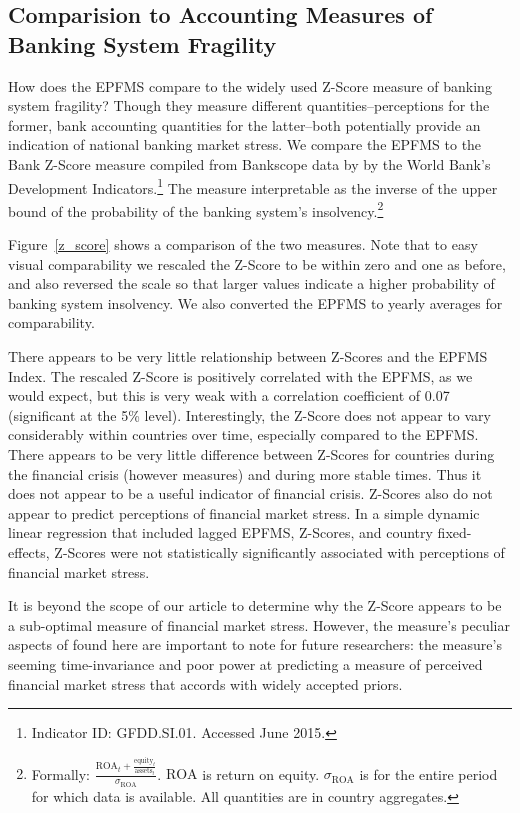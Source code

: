 \documentclass[]{article}
\begin{document}
\subsection{Comparision to Accounting Measures of Banking System Fragility}

How does the EPFMS compare to the widely used Z-Score measure of banking system fragility? Though they measure different quantities--perceptions for the former, bank accounting quantities for the latter--both potentially provide an indication of national banking market stress. We compare the EPFMS to the Bank Z-Score measure compiled from Bankscope data by by the World Bank's Development Indicators.\footnote{Indicator ID: GFDD.SI.01. Accessed June 2015.} The measure interpretable as the inverse of the upper bound of the probability of the banking system's insolvency.\footnote{Formally: $\frac{\mathrm{ROA}_{t} + \frac{\mathrm{equity}_{t}}{\mathrm{assets}_{t}}}{\sigma_{\mathrm{ROA}}}$. $\mathrm{ROA}$ is return on equity. $\sigma_{\mathrm{ROA}}$ is for the entire period for which data is available. All quantities are in country aggregates.}

Figure~\ref{z_score} shows a comparison of the two measures. Note that to easy visual comparability we rescaled the Z-Score to be within zero and one as before, and also reversed the scale so that larger values indicate a higher probability of banking system insolvency. We also converted the EPFMS to yearly averages for comparability.

There appears to be very little relationship between Z-Scores and the EPFMS Index. The rescaled Z-Score is positively correlated with the EPFMS, as we would expect, but this is very weak with a correlation coefficient of 0.07 (significant at the 5\% level). Interestingly, the Z-Score does not appear to vary considerably within countries over time, especially compared to the EPFMS. There appears to be very little difference between Z-Scores for countries during the financial crisis (however measures) and during more stable times. Thus it does not appear to be a useful indicator of financial crisis. Z-Scores also do not appear to predict perceptions of financial market stress. In a simple dynamic linear regression that included lagged EPFMS, Z-Scores, and country fixed-effects, Z-Scores were not statistically significantly associated with perceptions of financial market stress.

It is beyond the scope of our article to determine why the Z-Score appears to be a sub-optimal measure of financial market stress. However, the measure's peculiar aspects of found here are important to note for future researchers: the measure's seeming time-invariance and poor power at predicting a measure of perceived financial market stress that accords with widely accepted priors.
\end{document}
